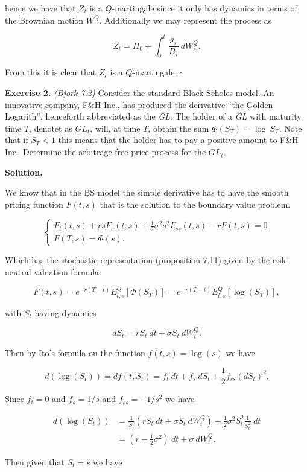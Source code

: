 \documentclass[
]{book}
\begin{document}
hence we have that \(Z_t\) is a \(Q\)-martingale since it only has dynamics in terms of the Brownian motion \(W^Q\). Additionally we may represent the process as

\[
Z_t=\Pi_0+\int_0^t\frac{g_s}{B_s}\ dW_s^Q.
\]

From this it is clear that \(Z_t\) is a \(Q\)-martingale. \(\square\)

\textbf{Exercise 2.} \emph{(Bjork 7.2)} Consider the standard Black-Scholes model. An innovative company, F\&H Inc., has produced the derivative ``the Golden Logarith'', henceforth abbreviated as the \emph{GL}. The holder of a \emph{GL} with maturity time \(T\), denotet as \(GL_t\), will, at time \(T\), obtain the sum \(\Phi(S_T)=\log\ S_T\). Note that if \(S_T<1\) this means that the holder has to pay a positive amount to F\&H Inc.~Determine the arbitrage free price process for the \(GL_t\).

\textbf{Solution.}

We know that in the BS model the simple derivative has to have the smooth pricing function \(F(t,s)\) that is the solution to the boundary value problem.

\[
\left\{
\begin{matrix}
F_t(t,s) + rsF_s(t,s)+\frac{1}{2}\sigma^2 s^2F_{ss}(t,s)-rF(t,s)=0\\
F(T,s)=\Phi(s).
\end{matrix}
\right.
\]

Which has the stochastic representation (proposition 7.11) given by the risk neutral valuation formula:

\[
F(t,s)=e^{-r(T-t)}E^Q_{t,s}[\Phi(S_T)]=e^{-r(T-t)}E^Q_{t,s}[\log(S_T)],
\]

with \(S_t\) having dynamics

\[
dS_t=rS_t\ dt+\sigma S_t\ dW_t^Q.
\]

Then by Ito's formula on the function \(f(t,s)=\log(s)\) we have

\[
d(\log(S_t))=d f(t,S_t)=f_t\ dt+f_s\ dS_t+\frac{1}{2}f_{ss}(dS_t)^2.
\]

Since \(f_t=0\) and \(f_s=1/s\) and \(f_{ss}=-1/s^2\) we have

\begin{align*}
d(\log(S_t))&=\frac{1}{S_t}(rS_t\ dt+\sigma S_t\ dW_t^Q)-\frac{1}{2}\sigma^2S_t^2\frac{1}{S_t^2}\ dt\\
&=\left(r-\frac{1}{2}\sigma^2\right)\ dt+\sigma \ dW_t^Q.
\end{align*}

Then given that \(S_t=s\) we have
\end{document}
